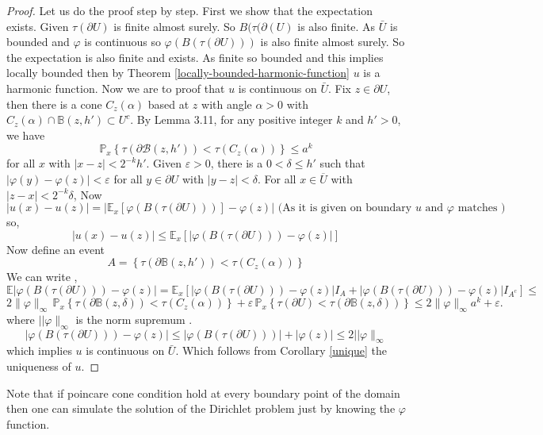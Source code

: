 \documentclass[11pt, a4paper, oneside]{report}
\numberwithin{equation}{section}
\begin{document}
\begin{proof}
Let us do the proof step by step. First we show that the expectation exists.
Given \(\tau(\partial U)\) is finite almost surely. So \(B(\tau(\partial(U)\) is also finite. As \(\bar{U}\) is bounded and \(\varphi\) is continuous so \(\varphi(B(\tau(\partial U)))\) is also finite almost surely. So the expectation is also finite and exists.
\noindent As finite so bounded and this implies locally bounded then by Theorem \ref{locally-bounded-harmonic-function} \(u\) is a harmonic function.
\noindent Now we are to proof that \(u\) is continuous on \(\bar{U}\). Fix \( z \in \partial U \), then there is a cone \( C_z(\alpha) \)
based at \( z \) with angle \( \alpha > 0 \) with \( C_z(\alpha) \cap \mathbb{B}(z, h') \subset U^c \). By Lemma 3.11, 
for any positive integer \( k \) and \( h' > 0 \), we have
\[
\mathbb{P}_x \left\{ \tau(\partial \mathcal{B}(z, h')) < \tau(C_z(\alpha)) \right\} \leq a^k
\]
for all \( x \) with \( |x - z| < 2^{-k} h' \). Given \( \varepsilon > 0 \), there is a \( 0 < \delta \leq h' \) such that 
\( |\varphi(y) - \varphi(z)| < \varepsilon \) for all \( y \in \partial U \) with \( |y - z| < \delta \). 
For all \( x \in \overline{U} \) with \( |z - x| < 2^{-k} \delta \),
Now \[
|u(x)-u(z)| = | \mathbb{E}_x[\varphi(B(\tau(\partial U)))]-\varphi(z)|
\text{ (As it is given on boundary \(u\) and \(\varphi\) matches )} 
\]
so,
\[
|u(x)-u(z)| \leq \mathbb{E}_x[|\varphi(B(\tau(\partial U)))-\varphi(z)|] 
\]
Now define an event \[A=\left\{ \tau(\partial \mathbb{B}(z, h')) < \tau(C_z(\alpha)) \right\}\]
We can write ,
\[
\mathbb{E}|\varphi(B(\tau(\partial U)))-\varphi(z)|=
\mathbb{E}_x[|\varphi(B(\tau(\partial U)))-\varphi(z)|I_A + |\varphi(B(\tau(\partial U)))-\varphi(z)|I_{A^c}] \leq 
\]
\[
2 \| \varphi \|_{\infty} \, \mathbb{P}_x \left\{ \tau(\partial \mathbb{B}(z, \delta)) < \tau(C_z(\alpha)) \right\} + 
\varepsilon \, \mathbb{P}_x \left\{ \tau(\partial U) < \tau(\partial \mathbb{B}(z, \delta)) \right\} 
\leq 2 \| \varphi \|_{\infty} a^k + \varepsilon.
\]
where \(||\varphi \|_{\infty}\) is the norm supremum .
\[
|\varphi(B(\tau(\partial U)))-\varphi(z)| \leq |\varphi(B(\tau(\partial U)))|+|\varphi(z)| \leq 2||\varphi \|_{\infty}
\]
which implies \(u \) is continuous on \(\bar{U}\). Which follows from Corollary \ref{unique} the uniqueness of \(u\).



\end{proof}
\noindent Note that if poincare cone condition hold at every boundary point of the domain then one can simulate the solution of the Dirichlet problem just by knowing the \(\varphi\) function.
\end{document}

